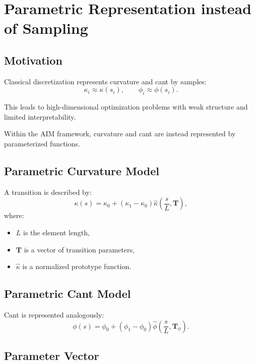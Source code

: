 
\section{Parametric Representation instead of Sampling}

\subsection{Motivation}

Classical discretization represents curvature and cant by samples:
\[
\kappa_i \approx \kappa(s_i),
\qquad
\phi_i \approx \phi(s_i).
\]

This leads to high-dimensional optimization problems with weak
structure and limited interpretability.

Within the AIM framework, curvature and cant are instead represented
by parameterized functions.


\subsection{Parametric Curvature Model}

\begin{definition}
A transition is described by:
\[
\kappa(s)
=
\kappa_0 + (\kappa_1 - \kappa_0)
\widehat{\kappa}\!\left(\frac{s}{L}, \mathbf{T}\right),
\]
where:
\begin{itemize}
\item \(L\) is the element length,
\item \(\mathbf{T}\) is a vector of transition parameters,
\item \(\widehat{\kappa}\) is a normalized prototype function.
\end{itemize}
\end{definition}


\subsection{Parametric Cant Model}

\begin{definition}
Cant is represented analogously:
\[
\phi(s)
=
\phi_0 + (\phi_1 - \phi_0)
\widehat{\phi}\!\left(\frac{s}{L}, \mathbf{T}_\phi\right).
\]
\end{definition}


\subsection{Parameter Vector}

